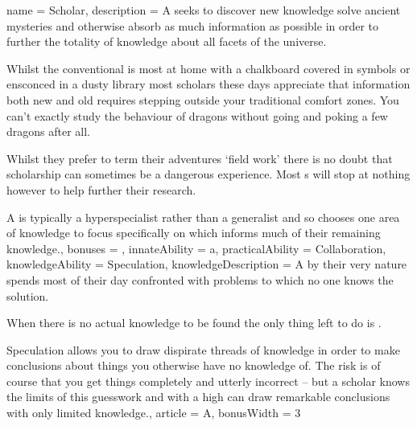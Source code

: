 \archetype
{
	name = Scholar,
	description = A \bname{} seeks to discover new knowledge\comma{} solve ancient mysteries and otherwise absorb as much information as possible\comma{} in order to further the totality of knowledge about all facets of the universe. 

Whilst the conventional \bname{} is most at home with a chalkboard covered in symbols\comma{} or ensconced in a dusty library\comma{} most scholars these days appreciate that information\comma{} both new and old\comma{} requires stepping outside your traditional comfort zones. You can’t exactly study the behaviour of dragons without going and poking a few dragons\comma{} after all. 

Whilst they prefer to term their adventures `field work’\comma{} there is no doubt that scholarship can sometimes be a dangerous experience. Most \bname{}s will stop at nothing\comma{} however\comma{} to help further their research. 

A \bname{} is typically a hyper\minus{}specialist\comma{} rather than a generalist\comma{} and so chooses one area of knowledge to focus specifically on\comma{} which informs much of their remaining knowledge.,
	bonuses = 
,
	innateAbility = a,
	practicalAbility = Collaboration,
	knowledgeAbility = Speculation,
	knowledgeDescription = A \bname{}\comma{} by their very nature\comma{} spends most of their day confronted with problems to which no one knows the solution. 

When there is no actual knowledge to be found\comma{} the only thing left to do is . 

Speculation allows you to draw dispirate threads of knowledge\comma{} in order to make conclusions about things you otherwise have no knowledge of. The risk is\comma{} of course\comma{} that you get things completely and utterly incorrect – but a scholar knows the limits of this guesswork\comma{} and with a high  can draw remarkable conclusions with only limited knowledge.,
	article = A,
	bonusWidth = 3
}

